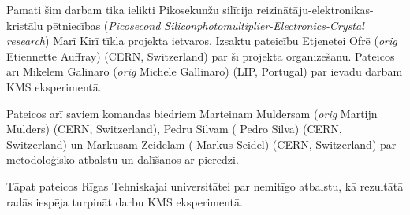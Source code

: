 Pamati šim darbam tika ielikti Pikosekunžu silīcija reizinātāju-elektronikas-kristālu pētniecības (\textit{Picosecond Siliconphotomultiplier-Electronics-Crystal research}) Marī Kirī tīkla projekta ietvaros. Izsaktu pateicību Etjenetei Ofrē (\textit{orig} Etiennette Auffray) (CERN, Switzerland) par šī projekta organizēšanu. Pateicos arī Mikelem Galinaro (\textit{orig} Michele Gallinaro) (LIP, Portugal) par ievadu darbam KMS eksperimentā.

Pateicos arī saviem komandas biedriem Marteinam Muldersam (\textit{orig} Martijn Mulders) (CERN, Switzerland), Pedru Silvam ( Pedro Silva) (CERN, Switzerland) un Markusam Zeidelam ( Markus Seidel) (CERN, Switzerland) par metodoloģisko atbalstu un dalīšanos ar pieredzi.

Tāpat pateicos Rīgas Tehniskajai universitātei par nemitīgo atbalstu, kā rezultātā radās iespēja turpināt darbu KMS eksperimentā.
